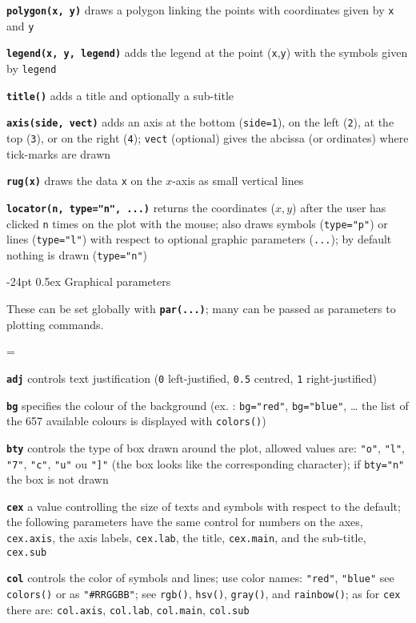 \documentclass[10pt,landscape]{article}
\makeatletter
\renewcommand\section{\@startsection{section}{1}{0mm}%
                                     {-24pt}%
                                     {0.5ex}%
                                {\color{blue}\normalfont\large\bfseries}}
\newcommand{\code}{\texttt}
\newcommand{\bcode}[1]{\texttt{\textbf{#1}}}
\makeatother
\begin{document}
\begin{multicols*}{3}
\bcode{polygon(x, y)}  draws a polygon linking the points with coordinates given by \code{x} and \code{y}

\bcode{legend(x, y, legend)}  adds the legend at the point (\code{x},\code{y}) with the symbols given by \code{legend}

\bcode{title()}  adds a title and optionally a sub-title

\bcode{axis(side, vect)}  adds an axis at the bottom (\code{side=1}), on the left (\code{2}), at the top (\code{3}), or on the right (\code{4}); \code{vect} (optional) gives the abcissa (or ordinates) where tick-marks are drawn

\bcode{rug(x)}  draws the data \code{x} on the $x$-axis as small vertical lines

\bcode{locator(n, type="n", ...)}  returns the coordinates ($x,y$) after the user has clicked \code{n} times on the plot with the mouse; also draws symbols (\code{type="p"}) or lines (\code{type="l"}) with respect to optional graphic parameters (\code{...}); by default nothing is drawn (\code{type="n"})

\section{Graphical parameters}

These can be set globally with \bcode{par(...)}; many can be passed as
parameters to plotting commands.

\everypar={\hangindent=9mm}

\bcode{adj}  controls text justification (\code{0} left-justified, \code{0.5} centred, \code{1} right-justified)

\bcode{bg}  specifies the colour of the background (ex. : \code{bg="red"}, \code{bg="blue"}, \ldots{} the list of the 657 available colours is displayed with \code{colors()})

\bcode{bty}  controls the type of box drawn around the plot, allowed values are: \code{"o"}, \code{"l"}, \code{"7"}, \code{"c"}, \code{"u"} ou \code{"]"} (the box looks like the corresponding character); if \code{bty="n"} the box is not drawn

\bcode{cex}  a value controlling the size of texts and symbols with respect to the default; the following parameters have the same control for numbers on the axes, \code{cex.axis}, the axis labels, \code{cex.lab}, the title, \code{cex.main}, and the sub-title, \code{cex.sub}

\bcode{col}  controls the color of symbols and lines; use color names:
\code{"red"}, \code{"blue"} see \code{colors()} or as \code{"\#RRGGBB"};
see \code{rgb()}, \code{hsv()}, \code{gray()}, and \code{rainbow()}; as for \code{cex} there are: \code{col.axis}, \code{col.lab}, \code{col.main}, \code{col.sub}


\end{multicols*}
\end{document}
